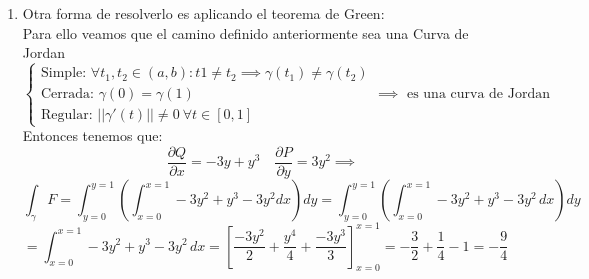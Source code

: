 {\begin{enumerate}
              $$
                  + \int_{t=\frac{3}{4}}^{t=1} \langle (4-4t)^2, (4-4t)^2 \rangle, (0,-4) \rangle dt
              $$
              Y resolveriamos las integrales polinómicas de forma usual.
        \item Otra forma de resolverlo es aplicando el teorema de Green: \\ Para ello veamos
              que el camino definido anteriormente sea una Curva de Jordan $$\begin{cases}
                      \text{Simple: } \forall t_1, t_2 \in (a,b) : t1 \neq t_2 \implies \gamma(t_1) \neq \gamma(t_2) \\
                      \text{Cerrada: } \gamma(0) = \gamma(1)                                                         \\
                      \text{Regular: } ||\gamma'(t)|| \neq 0 \ \forall t \in [0,1]
                  \end{cases} \implies \text{ es una curva de Jordan}$$
              Entonces tenemos que:
              $$\frac{\partial Q}{\partial x} =   -3y + y^3 \quad \frac{\partial P}{\partial y} = 3y^2 \implies$$
              $$\int_{\gamma} F = \int_{y=0}^{y=1} \left(\int_{x=0}^{x=1} -3y^2 +y^3 -3y^2 dx \right)dy = \int_{y=0}^{y=1} \left( \int_{x=0}^{x=1} -3y^2 + y^3 - 3y^2 \, dx \right) dy$$
              $$= \int_{x=0}^{x=1} -3y^2 + y^3 - 3y^2 \, dx = \left[\frac{-3y^2}{2} + \frac{y^4}{4} + \frac{-3y^3}{3}\right]^{x=1}_{x=0} = -\frac{3}{2} + \frac{1}{4} - 1 = -\frac{9}{4}$$
    \end{enumerate}
}

